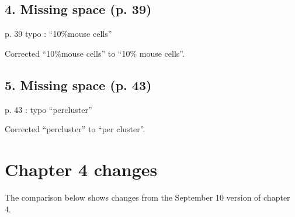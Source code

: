 \documentclass[11pt,a4paper]{article}
\begin{document}
\subsection*{\sffamily\color{heading}4. Missing space (p. 39)}

\begin{reviewcomment}
p. 39 typo : “10\%mouse cells”
\end{reviewcomment}

Corrected “10\%mouse cells” to “10\% mouse cells”.

\subsection*{\sffamily\color{heading}5. Missing space (p. 43)}

\begin{reviewcomment}
p. 43 : typo “percluster”
\end{reviewcomment}

Corrected “percluster” to “per cluster”.
\clearpage
\appendix
\section[Chapter 4 changes]{\sffamily\color{heading}Chapter 4 changes}
\label{app:chapter4-diff}
The comparison below shows changes from the September 10 version of chapter 4.

\begingroup
\sloppy
\setlength{\parskip}{0.5\baselineskip}

\endgroup
\end{document}
